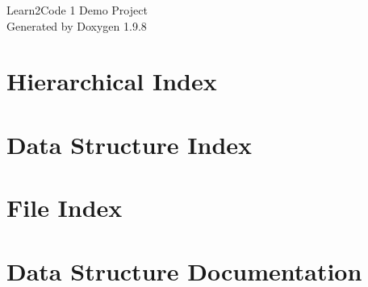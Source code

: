 \documentclass[twoside]{book}
\newcommand{\+}{\discretionary{\mbox{\scriptsize$\hookleftarrow$}}{}{}}
\newcommand{\clearemptydoublepage}{%
    \newpage{\pagestyle{empty}\cleardoublepage}%
  }
\begin{document}
  \raggedbottom
    \hypersetup{pageanchor=false,
                bookmarksnumbered=true,
                pdfencoding=unicode
               }
  \begin{titlepage}
  \vspace*{7cm}
  \begin{center}%
  {\Large Learn2\+Code 1 Demo Project}\\
  \vspace*{1cm}
  {\large Generated by Doxygen 1.9.8}\\
  \end{center}
  \end{titlepage}
  \clearemptydoublepage
  \tableofcontents
  \clearemptydoublepage
  \hypersetup{pageanchor=true}

\chapter{Hierarchical Index}

\chapter{Data Structure Index}

\chapter{File Index}

\chapter{Data Structure Documentation}
















\end{document}
